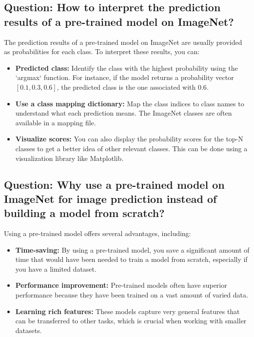 \documentclass{article}
\begin{document}
\subsection{Question: How to interpret the prediction results of a pre-trained model on ImageNet?}

\justify
The prediction results of a pre-trained model on ImageNet are usually provided as probabilities for each class. To interpret these results, you can:

\begin{itemize}
    \item \textbf{Predicted class:} Identify the class with the highest probability using the `argmax` function. For instance, if the model returns a probability vector \([0.1, 0.3, 0.6]\), the predicted class is the one associated with \(0.6\).
    
    \item \textbf{Use a class mapping dictionary:} Map the class indices to class names to understand what each prediction means. The ImageNet classes are often available in a mapping file.
    
    \item \textbf{Visualize scores:} You can also display the probability scores for the top-N classes to get a better idea of other relevant classes. This can be done using a visualization library like Matplotlib.
\end{itemize}

\subsection{Question: Why use a pre-trained model on ImageNet for image prediction instead of building a model from scratch?}

\justify
Using a pre-trained model offers several advantages, including:

\begin{itemize}
    \item \textbf{Time-saving:} By using a pre-trained model, you save a significant amount of time that would have been needed to train a model from scratch, especially if you have a limited dataset.
    
    \item \textbf{Performance improvement:} Pre-trained models often have superior performance because they have been trained on a vast amount of varied data.
    
    \item \textbf{Learning rich features:} These models capture very general features that can be transferred to other tasks, which is crucial when working with smaller datasets.
\end{itemize}
\end{document}
